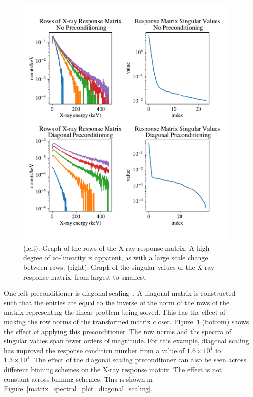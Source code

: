 \begin{figure}[p]
    \centering
    \includegraphics[width=\textwidth]{figures/chapter_4/matrix_spectral_plot/matrix_spectral_plot2.pdf}
    \caption{(left): Graph of the rows of the X-ray response matrix. A high degree of co-linearity is apparent, as with a large scale change between rows. (right): Graph of the singular values of the X-ray response matrix, from largest to smallest. }
    \label{matrix_spectral_plot}
\end{figure}

One left-preconditioner is diagonal scaling~\citep{Pini1990}. A diagonal matrix is constructed such that the entries are equal to the inverse of the norm of the rows of the matrix representing the linear problem being solved. This has the effect of making the row norms of the transformed matrix closer. Figure~\ref{matrix_spectral_plot} (bottom) shows the effect of applying this preconditioner. The row norms and the spectra of singular values span fewer orders of magnitude. For this example, diagonal scaling has improved the response condition number from a value of $1.6\times10^4$ to $1.3\times10^4$. The effect of the diagonal scaling preconditoner can also be seen across different binning schemes on the X-ray response matrix. The effect is not constant across binning schemes. This is shown in Figure~\ref{matrix_spectral_plot_diagonal_scaling}.

